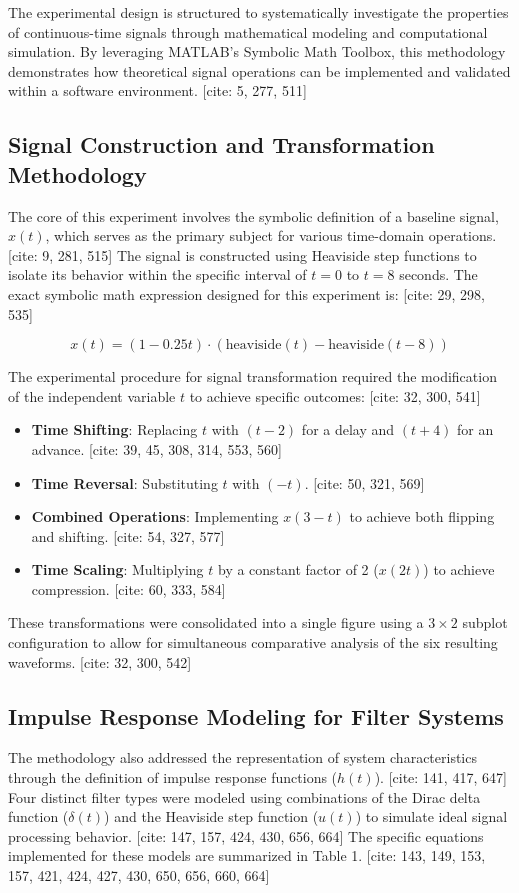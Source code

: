 The experimental design is structured to systematically investigate the properties of continuous-time signals through mathematical modeling and computational simulation. By leveraging MATLAB’s Symbolic Math Toolbox, this methodology demonstrates how theoretical signal operations can be implemented and validated within a software environment. [cite: 5, 277, 511]

\subsection{Signal Construction and Transformation Methodology}
The core of this experiment involves the symbolic definition of a baseline signal, $x(t)$, which serves as the primary subject for various time-domain operations. [cite: 9, 281, 515] The signal is constructed using Heaviside step functions to isolate its behavior within the specific interval of $t = 0$ to $t = 8$ seconds. The exact symbolic math expression designed for this experiment is: [cite: 29, 298, 535]

\begin{equation}
x(t) = (1 - 0.25t) \cdot (\text{heaviside}(t) - \text{heaviside}(t - 8))
\end{equation}

The experimental procedure for signal transformation required the modification of the independent variable $t$ to achieve specific outcomes: [cite: 32, 300, 541]
\begin{itemize}
    \item \textbf{Time Shifting}: Replacing $t$ with $(t - 2)$ for a delay and $(t + 4)$ for an advance. [cite: 39, 45, 308, 314, 553, 560]
    \item \textbf{Time Reversal}: Substituting $t$ with $(-t)$. [cite: 50, 321, 569]
    \item \textbf{Combined Operations}: Implementing $x(3-t)$ to achieve both flipping and shifting. [cite: 54, 327, 577]
    \item \textbf{Time Scaling}: Multiplying $t$ by a constant factor of 2 ($x(2t)$) to achieve compression. [cite: 60, 333, 584]
\end{itemize}

These transformations were consolidated into a single figure using a $3 \times 2$ subplot configuration to allow for simultaneous comparative analysis of the six resulting waveforms. [cite: 32, 300, 542]

\subsection{Impulse Response Modeling for Filter Systems}
The methodology also addressed the representation of system characteristics through the definition of impulse response functions ($h(t)$). [cite: 141, 417, 647] Four distinct filter types were modeled using combinations of the Dirac delta function ($\delta(t)$) and the Heaviside step function ($u(t)$) to simulate ideal signal processing behavior. [cite: 147, 157, 424, 430, 656, 664] The specific equations implemented for these models are summarized in Table 1. [cite: 143, 149, 153, 157, 421, 424, 427, 430, 650, 656, 660, 664]

